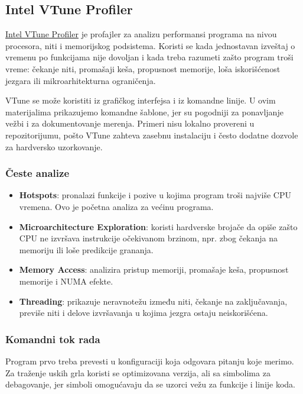 \subsection{Intel VTune Profiler}\label{intel-vtune-profiler}

\href{https://www.intel.com/content/www/us/en/developer/tools/oneapi/vtune-profiler.html}{Intel VTune Profiler} je profajler za analizu performansi programa na nivou procesora, niti i memorijskog podsistema. Koristi se kada jednostavan izveštaj o vremenu po funkcijama nije dovoljan i kada treba razumeti zašto program troši vreme: čekanje niti, promašaji keša, propusnost memorije, loša iskorišćenost jezgara ili mikroarhitekturna ograničenja.

VTune se može koristiti iz grafičkog interfejsa i iz komandne linije. U ovim materijalima prikazujemo komandne šablone, jer su pogodniji za ponavljanje vežbi i za dokumentovanje merenja. Primeri nisu lokalno provereni u repozitorijumu, pošto VTune zahteva zasebnu instalaciju i često dodatne dozvole za hardversko uzorkovanje.

\subsubsection{Česte analize}\label{vtune-ceste-analize}

\begin{itemize}
\tightlist
\item
  \textbf{Hotspots}: pronalazi funkcije i pozive u kojima program troši najviše CPU vremena. Ovo je početna analiza za većinu programa.
\item
  \textbf{Microarchitecture Exploration}: koristi hardverske brojače da opiše zašto CPU ne izvršava instrukcije očekivanom brzinom, npr. zbog čekanja na memoriju ili loše predikcije grananja.
\item
  \textbf{Memory Access}: analizira pristup memoriji, promašaje keša, propusnost memorije i NUMA efekte.
\item
  \textbf{Threading}: prikazuje neravnotežu između niti, čekanje na zaključavanja, previše niti i delove izvršavanja u kojima jezgra ostaju neiskorišćena.
\end{itemize}

\subsubsection{Komandni tok rada}\label{vtune-komandni-tok-rada}

Program prvo treba prevesti u konfiguraciji koja odgovara pitanju koje merimo. Za traženje uskih grla koristi se optimizovana verzija, ali sa simbolima za debagovanje, jer simboli omogućavaju da se uzorci vežu za funkcije i linije koda.

